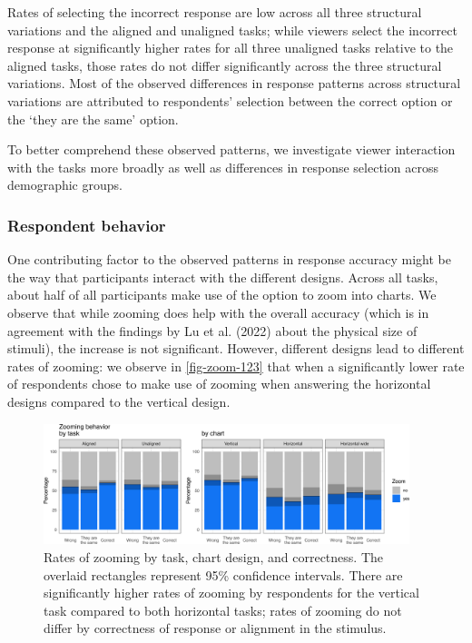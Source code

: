 \documentclass[
]{jds}
\begin{document}
Rates of selecting the incorrect response are low across all three
structural variations and the aligned and unaligned tasks; while viewers
select the incorrect response at significantly higher rates for all
three unaligned tasks relative to the aligned tasks, those rates do not
differ significantly across the three structural variations. Most of the
observed differences in response patterns across structural variations
are attributed to respondents' selection between the correct option or
the `they are the same' option.

To better comprehend these observed patterns, we investigate viewer
interaction with the tasks more broadly as well as differences in
response selection across demographic groups.

\hypertarget{respondent-behavior}{%
\subsubsection{Respondent behavior}\label{respondent-behavior}}

One contributing factor to the observed patterns in response accuracy
might be the way that participants interact with the different designs.
Across all tasks, about half of all participants make use of the option
to zoom into charts. We observe that while zooming does help with the
overall accuracy (which is in agreement with the findings by Lu et al.
(2022) about the physical size of stimuli), the increase is not
significant. However, different designs lead to different rates of
zooming: we observe in \autoref{fig-zoom-123} that when a significantly
lower rate of respondents chose to make use of zooming when answering
the horizontal designs compared to the vertical design.

\begin{figure}[hbt]

{\centering \includegraphics[width=0.95\textwidth,height=\textheight]{./figures/fig-zoom-123-1.png}

}

\caption{\label{fig-zoom-123}Rates of zooming by task, chart design, and
correctness. The overlaid rectangles represent 95\% confidence
intervals. There are significantly higher rates of zooming by
respondents for the vertical task compared to both horizontal tasks;
rates of zooming do not differ by correctness of response or alignment
in the stimulus.}

\end{figure}
\end{document}
